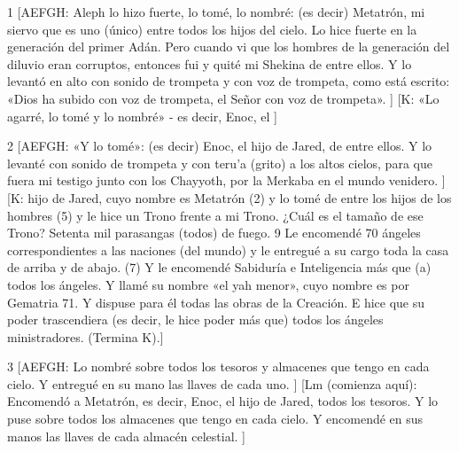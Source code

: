 \par 1 [AEFGH: Aleph lo hizo fuerte, lo tomé, lo nombré: (es decir) Metatrón, mi siervo que es uno (único) entre todos los hijos del cielo. Lo hice fuerte en la generación del primer Adán. Pero cuando vi que los hombres de la generación del diluvio eran corruptos, entonces fui y quité mi Shekina de entre ellos. Y lo levantó en alto con sonido de trompeta y con voz de trompeta, como está escrito: «Dios ha subido con voz de trompeta, el Señor con voz de trompeta». ] [K: «Lo agarré, lo tomé y lo nombré» - es decir, Enoc, el ]


\par 2 [AEFGH: «Y lo tomé»: (es decir) Enoc, el hijo de Jared, de entre ellos. Y lo levanté con sonido de trompeta y con teru'a (grito) a los altos cielos, para que fuera mi testigo junto con los Chayyoth, por la Merkaba en el mundo venidero. ] [K: hijo de Jared, cuyo nombre es Metatrón (2) y lo tomé de entre los hijos de los hombres (5) y le hice un Trono frente a mi Trono. ¿Cuál es el tamaño de ese Trono? Setenta mil parasangas (todos) de fuego. 9 Le encomendé 70 ángeles correspondientes a las naciones (del mundo) y le entregué a su cargo toda la casa de arriba y de abajo. (7) Y le encomendé Sabiduría e Inteligencia más que (a) todos los ángeles. Y llamé su nombre «el yah menor», ​​cuyo nombre es por Gematria 71. Y dispuse para él todas las obras de la Creación. E hice que su poder trascendiera (es decir, le hice poder más que) todos los ángeles ministradores. (Termina K).]

\par 3 [AEFGH: Lo nombré sobre todos los tesoros y almacenes que tengo en cada cielo. Y entregué en su mano las llaves de cada uno. ] [Lm (comienza aquí): Encomendó a Metatrón, es decir, Enoc, el hijo de Jared, todos los tesoros. Y lo puse sobre todos los almacenes que tengo en cada cielo. Y encomendé en sus manos las llaves de cada almacén celestial. ]

